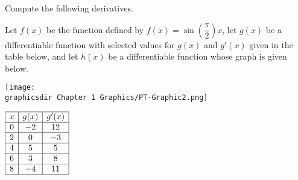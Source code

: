 \begin{questions}
    \question Compute the following derivatives. \\

     \horizontalline

    \newpage

    \question Let $f(x)$ be the function defined by $f(x) = \sin \left(\dfrac{\pi}{2}\right)x$, let $g(x)$ be a differentiable function with selected values for $g(x)$ and $g'(x)$ given in the table below, and let $h(x)$ be a differentiable function whose graph is given below. \\
    \begin{minipage}[t]{0.75\textwidth} \vspace{0pt}%
        \texttt{[image: \\graphicsdir Chapter 1 Graphics/PT-Graphic2.png]}
    \end{minipage} \hfill \begin{minipage}[t]{0.2\textwidth} \vspace{11pt}%
        \def\arraystretch{1.4}
        $\begin{array}{|c|c|c|}
            \hline
            x & g(x) & g'(x) \\ \hline
            0 & -2 & 12 \\ \hline
            2 & 0 & -3 \\ \hline
            4 & 5 & 5 \\ \hline
            6 & 3 & 8\\ \hline
            8 & -4 & 11 \\
            \hline
        \end{array}$
    \end{minipage} \\[11pt] \horizontalline


\end{questions}
